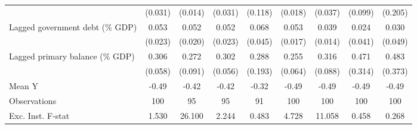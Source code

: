 {\begin{tabular}{l*{8}{c}}
                    &     (0.031)         &     (0.014)         &     (0.031)         &     (0.118)         &     (0.018)         &     (0.037)         &     (0.099)         &     (0.205)         \\
\addlinespace
Lagged government debt (\% GDP)&       0.053\sym{**} &       0.052\sym{***}&       0.052\sym{**} &       0.068         &       0.053\sym{***}&       0.039\sym{***}&       0.024         &       0.030         \\
                    &     (0.023)         &     (0.020)         &     (0.023)         &     (0.045)         &     (0.017)         &     (0.014)         &     (0.041)         &     (0.049)         \\
\addlinespace
Lagged primary balance (\% GDP)&       0.306\sym{***}&       0.272\sym{***}&       0.302\sym{***}&       0.288         &       0.255\sym{***}&       0.316\sym{***}&       0.471         &       0.483         \\
                    &     (0.058)         &     (0.091)         &     (0.056)         &     (0.193)         &     (0.064)         &     (0.088)         &     (0.314)         &     (0.373)         \\
\midrule
Mean Y              &       -0.49         &       -0.42         &       -0.42         &       -0.32         &       -0.49         &       -0.49         &       -0.49         &       -0.49         \\
Observations        &         100         &          95         &          95         &          91         &         100         &         100         &         100         &         100         \\
Exc. Inst. F-stat   &       1.530         &      26.100         &       2.244         &       0.483         &       4.728         &      11.058         &       0.458         &       0.268         \\
\bottomrule
\end{tabular}
}
